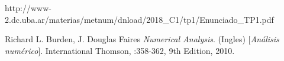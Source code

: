 \begin{thebibliography}{9}


http://www-2.dc.uba.ar/materias/metnum/dnload/2018\_C1/tp1/Enunciado\_TP1.pdf

Richard L. Burden, J. Douglas Faires
\textit{Numerical Analysis}. (Ingles) 
[\textit{An\'alisis num\'erico}]. 
International Thomson, :358-362, 9th Edition, 2010.

\end{thebibliography}
